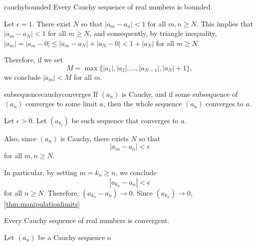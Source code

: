
\begin{prop}{}{cauchybounded}
	Every Cauchy sequence of real numbers is bounded.
\end{prop}

\begin{dem}{}{}
	Let \(\epsilon = 1\). There exist \(N\) so that \(|a_m - a_n| < 1\) for all \(m, n \geq N\). This implies that \(|a_m - a_N| < 1\) for all \(m \geq N\), and consequently, by triangle inequality, \(|a_m| = |a_m - 0| \leq |a_m - a_N| + |a_N - 0| < 1 + |a_N|\) for all \(m \geq N\).

	Therefore, if we set \[
		M = \max\{|a_1|, |a_2|, \dots, |a_{N-1}|, |a_N| + 1\},
	\]
	we conclude \(|a_m| < M\) for all \(m\).
\end{dem}

\begin{prop}{}{subsequencecauchyconverges}
	If \((a_n)\) is Cauchy, and if some subsequence of \((a_n)\) converges to some limit \(a\), then the whole sequence \((a_n)\) converges to \(a\).
\end{prop}

\begin{dem}{}{}
	Let \(\epsilon > 0\). Let \((a_{k_i})\) be such sequence that converges to \(a\).

	Also, since \((a_n)\) is Cauchy, there exists \(N\) so that \[
		|a_m - a_n| < \epsilon
	\] for all \(m, n \geq N\).

	In particular, by setting \(m = k_n \geq n\), we conclude \[
		|a_{k_n} - a_n| < \epsilon
	\] for all \(n \geq N\). Therefore, \((a_{k_n} - a_n) \to 0\). Since \((a_{k_n}) \to 0\), \ref{thm:manipulationlimits}
\end{dem}

\begin{thm}{}{}
	Every Cauchy sequence of real numbers is convergent.
\end{thm}

\begin{dem}{}{}
	Let \((a_n)\) be a Cauchy sequence o
\end{dem}

